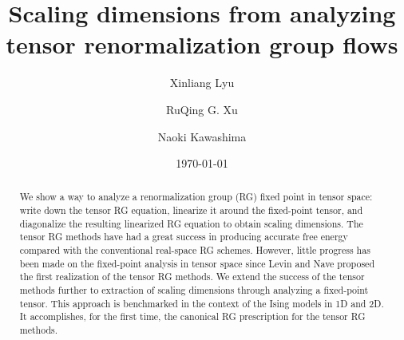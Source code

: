 \documentclass[aps,prb,reprint,superscriptaddress,floatfix]{revtex4-2}
\begin{document}

\title{Scaling dimensions from analyzing tensor renormalization group
flows}


\author{Xinliang Lyu} 
 \author{RuQing G. Xu}
 \author{Naoki Kawashima}
     



\date{\today}

\begin{abstract} 
    We show a way to analyze a renormalization group (RG) fixed point in tensor space: write down the tensor RG equation, linearize it around the fixed-point tensor, and diagonalize the resulting linearized RG equation to obtain scaling dimensions. 
    The tensor RG methods have had a great success in producing accurate free energy compared with the conventional real-space RG schemes.
    However, little progress has been made on the fixed-point analysis in tensor space since Levin and Nave proposed the first realization of the tensor RG methods.
    We extend the success of the tensor methods further to extraction of scaling dimensions through analyzing a fixed-point tensor.
    This approach is benchmarked in the context of the Ising models in 1D and 2D.
    It accomplishes, for the first time, the canonical RG prescription for the tensor RG methods.
\end{abstract}
\end{document}
